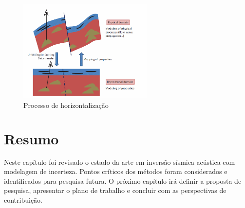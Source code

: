 \begin{figure}[htp]
\begin{center}
  \includegraphics[width=0.6\textwidth]{fig/horizontes}
  \caption{Processo de horizontalização \citep[p. 143]{caers2011modeling}}
  \label{fig:hor}
\end{center}
\end{figure}

\section{Resumo}

Neste capítulo foi revisado o estado da arte em inversão sísmica acústica
com modelagem de incerteza. Pontos críticos dos métodos foram considerados e
identificados para pesquisa futura. O próximo capítulo irá definir a proposta de
pesquisa, apresentar o plano de trabalho e concluir com as perspectivas de
contribuição.





